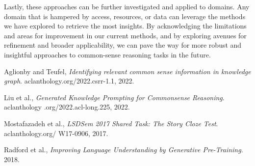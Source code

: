 \documentclass{article}
\begin{document}
\begin{multicols}{2}
Lastly, these approaches can be further investigated and applied to domains. Any domain that is hampered by access, resources, or data can leverage the methods we have explored to retrieve the most insights. By acknowledging the limitations and areas for improvement in our current methods, and by exploring avenues for refinement and broader applicability, we can pave the way for more robust and insightful approaches to common-sense reasoning tasks in the future.


\begin{thebibliography}{999}
    Aglionby and Teufel,
    \emph{Identifying relevant common sense information in knowledge graph}.
    aclanthology.org/2022.csrr-1.1,
    2022.

    Liu et al.,
    \emph{Generated Knowledge Prompting for Commonsense Reasoning}.
    aclanthology .org/2022.acl-long.225,
    2022.

    Mostafazadeh et al.,
    \emph{LSDSem 2017 Shared Task: The Story Cloze Test}.
    aclanthology.org/ W17-0906,
    2017.

    Radford et al.,
    \emph{Improving Language Understanding by Generative Pre-Training}.
    2018.


\end{thebibliography}

\end{multicols}
\end{document}
